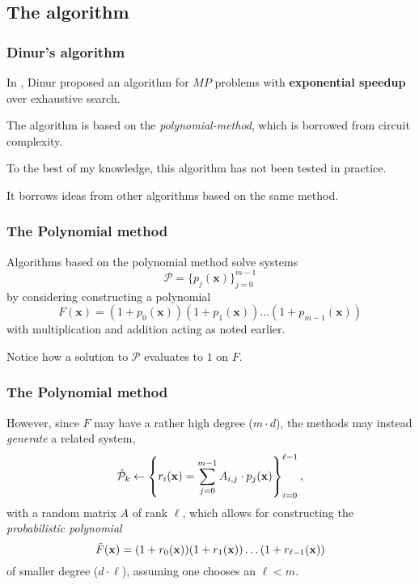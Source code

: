 \documentclass{beamer}
\begin{document}
\subsection{The algorithm}
\begin{frame}
    \frametitle{Dinur's algorithm}
    In \cite{eurocrypt-2021-30841}, Dinur proposed an algorithm for $MP$ problems with \textbf{exponential speedup} over exhaustive search.

    The algorithm is based on the \textit{polynomial-method}, which is borrowed from circuit complexity.

    To the best of my knowledge, this algorithm has not been tested in practice.

    It borrows ideas from other algorithms based on the same method.
\end{frame}

\begin{frame}
    \frametitle{The Polynomial method}
    Algorithms based on the polynomial method solve systems 
    $$
        \mathcal{P} = \{p_j(\mathbf{x})\}^{m - 1}_{j = 0}
    $$ 
    by considering constructing a polynomial 
    $$
        F(\mathbf{x}) = (1 + p_0(\mathbf{x}))(1 + p_1(\mathbf{x})) \dots (1 + p_{m - 1}(\mathbf{x}))
    $$
    with multiplication and addition acting as noted earlier.

    Notice how a solution to $\mathcal{P}$ evaluates to $1$ on $F$.
\end{frame}

\begin{frame}
    \frametitle{The Polynomial method}
    However, since $F$ may have a rather high degree ($m \cdot d$), the methods may instead \textit{generate} a related system, 
    $$
        \Tilde{\mathcal{P}}_k \gets \left\{r_i(\mathbf{x}) = \sum_{j = 0}^{m-1}A_{i,j} \cdot p_j(\mathbf{x})\right\}^{\ell - 1}_{i = 0},
    $$
    with a random matrix $A$ of rank $\ell$, which allows for constructing the \textit{probabilistic polynomial}
    $$
        \Tilde{F}(\mathbf{x}) = (1 + r_0(\mathbf{x}))(1 + r_1(\mathbf{x})) \dots (1 + r_{\ell - 1}(\mathbf{x})) 
    $$
    of smaller degree ($d \cdot \ell$), assuming one chooses an $\ell < m$.
\end{frame}
\end{document}
